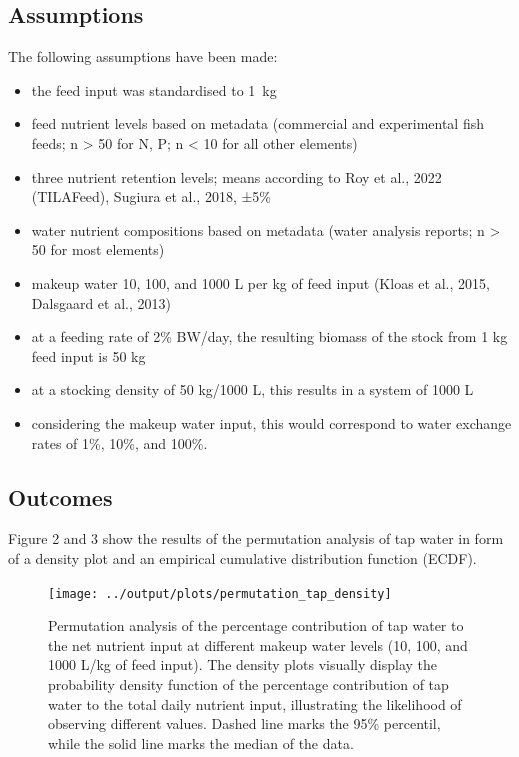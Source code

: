 \documentclass[
]{article}
\providecommand{\tightlist}{%
  \setlength{\itemsep}{0pt}\setlength{\parskip}{0pt}}
\begin{document}
\hypertarget{assumptions}{%
\subsection{Assumptions}\label{assumptions}}

The following assumptions have been made:

\begin{itemize}
\tightlist
\item
  the feed input was standardised to \SI{1}{\kg}
\item
  feed nutrient levels based on metadata (commercial and experimental
  fish feeds; n \textgreater{} 50 for N, P; n \textless{} 10 for all
  other elements)
\item
  three nutrient retention levels; means according to Roy et al., 2022
  (TILAFeed), Sugiura et al., 2018, ±5\%
\item
  water nutrient compositions based on metadata (water analysis reports;
  n \textgreater{} 50 for most elements)
\item
  makeup water 10, 100, and 1000 L per kg of feed input (Kloas et al.,
  2015, Dalsgaard et al., 2013)
\item
  at a feeding rate of 2\% BW/day, the resulting biomass of the stock
  from 1 kg feed input is 50 kg
\item
  at a stocking density of 50 kg/1000 L, this results in a system of
  1000 L
\item
  considering the makeup water input, this would correspond to water
  exchange rates of 1\%, 10\%, and 100\%.
\end{itemize}

\hypertarget{outcomes}{%
\subsection{Outcomes}\label{outcomes}}

Figure 2 and 3 show the results of the permutation analysis of tap water
in form of a density plot and an empirical cumulative distribution
function (ECDF).

\begin{figure}
\texttt{[image: ../output/plots/permutation\_tap\_density]} \caption{Permutation analysis of the percentage contribution of tap water to the net nutrient input at different makeup water levels (10, 100, and 1000 L/kg of feed input). The density plots visually display the probability density function of the percentage contribution of tap water to the total daily nutrient input, illustrating the likelihood of observing different values. Dashed line marks the 95\% percentil, while the solid line marks the median of the data.}\label{fig:permutation_rain}
\end{figure}
\end{document}
